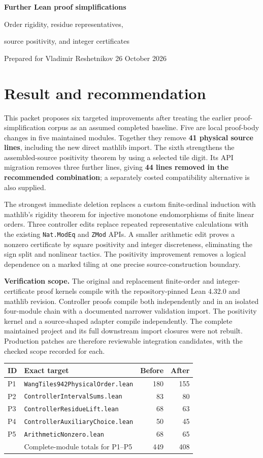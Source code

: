 \documentclass[11pt]{article}
\newcommand{\code}[1]{\nolinkurl{#1}}
\begin{document}
{\sffamily\color{ink}\LARGE\bfseries Further Lean proof simplifications\par}
{\sffamily\color{ink}\Large Order rigidity, residue representatives,\par source positivity, and integer certificates\par}
\vspace{5pt}
{\sffamily Prepared for Vladimir Reshetnikov \hfill 26 October 2026}

\section*{Result and recommendation}

This packet proposes six targeted improvements after treating the earlier proof-simplification corpus as an assumed completed baseline. Five are local proof-body changes in five maintained modules. Together they remove \textbf{41 physical source lines}, including the new direct mathlib import. The sixth strengthens the assembled-source positivity theorem by using a selected tile digit. Its API migration removes three further lines, giving \textbf{44 lines removed in the recommended combination}; a separately costed compatibility alternative is also supplied.

The strongest immediate deletion replaces a custom finite-ordinal induction with mathlib's rigidity theorem for injective monotone endomorphisms of finite linear orders. Three controller edits replace repeated representative calculations with the existing \code{Nat.ModEq} and \code{ZMod} APIs. A smaller arithmetic edit proves a nonzero certificate by square positivity and integer discreteness, eliminating the sign split and nonlinear tactics. The positivity improvement removes a logical dependence on a marked tiling at one precise source-construction boundary.

\textbf{Verification scope.} The original and replacement finite-order and integer-certificate proof kernels compile with the repository-pinned Lean 4.32.0 and mathlib revision. Controller proofs compile both independently and in an isolated four-module chain with a documented narrower validation import. The positivity kernel and a source-shaped adapter compile independently. The complete maintained project and its full downstream import closures were not rebuilt. Production patches are therefore reviewable integration candidates, with the checked scope recorded for each.

\begin{tabularx}{\linewidth}{@{}lYrr@{}}
\toprule
ID & Exact target & Before & After\\
\midrule
P1 & \code{WangTiles942PhysicalOrder.lean} & 180 & 155\\
P2 & \code{ControllerIntervalSums.lean} & 83 & 80\\
P3 & \code{ControllerResidueLift.lean} & 68 & 63\\
P4 & \code{ControllerAuxiliaryChoice.lean} & 50 & 45\\
P5 & \code{ArithmeticNonzero.lean} & 68 & 65\\
\midrule
 & Complete-module totals for P1--P5 & 449 & 408\\
\bottomrule
\end{tabularx}
\end{document}
